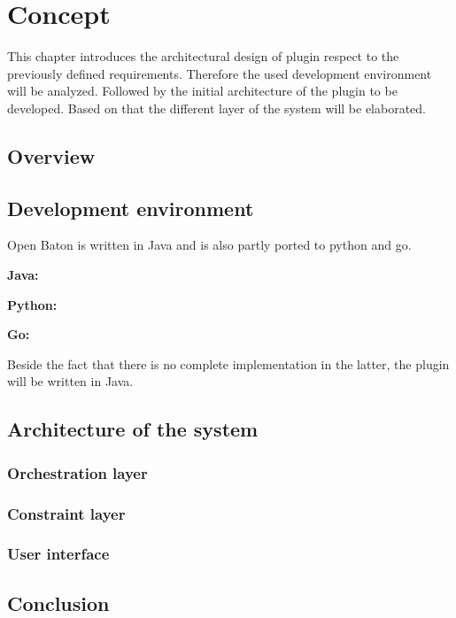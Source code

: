 \acresetall

\chapter{Concept}\label{chapter:concept}
This chapter introduces the architectural design of plugin respect to the previously defined requirements.
Therefore the used development environment will be analyzed.
Followed by the initial architecture of the plugin to be developed.
Based on that the different layer of the system will be elaborated.

\section{Overview}
\doit

\section{Development environment}
\doit

Open Baton is written in Java and is also partly ported to python and go.

\textbf{Java:}

\textbf{Python:}

\textbf{Go:}

Beside the fact that there is no complete implementation in the latter, the plugin will be written in Java.


\section{Architecture of the system}
\doit


\subsection{Orchestration layer}
\doit

\subsection{Constraint layer}
\doit

\subsection{User interface}
\doit

\section{Conclusion}
\doit
